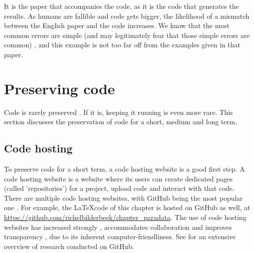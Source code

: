 It is the paper that accompanies the code,
as it is the code that generates the results.
As humans are fallible and code gets bigger, the likelihood of
a mismatch between the English paper and the code increases.
We know that the most common errors are 
simple (and may legitimately fear that those simple errors are common) 
\cite{baggerly2009deriving, vable2021code},
and this example is not too far off from the
examples given in that paper.

\section{Preserving code}


Code is rarely preserved \cite{barnes2010publish}.
If it is, keeping it running is even more rare.
This section discusses the preservation of code for a short, medium
and long term.

\subsection{Code hosting}\label{subsec:code-hosting}

To preserve code for a short term, 
a code hosting website is a good first step.
A code hosting website is a website where 
its users can create dedicated pages (called 'repositories')
for a project, upload code and interact with that code.
There are multiple code hosting websites, 
with GitHub being the most popular one \cite{cosentino2017systematic}.
For example, the \LaTeX code of this chapter is hosted on GitHub 
as well, at \url{https://github.com/richelbilderbeek/chapter_paradata}.
The use of code hosting websites
has increased strongly \cite{russell2018large},
accommodates collaboration \cite{perez2016ten}
and improves transparency \cite{gorgolewski2016practical},
due to its inherent computer-friendliness.
See \cite{cosentino2017systematic} for an extensive overview of
research conducted on GitHub.

